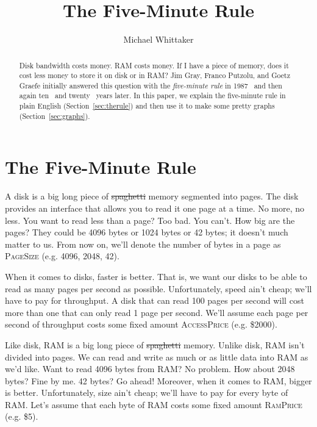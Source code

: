 \documentclass[12pt]{article}
\title{The Five-Minute Rule}
\author{Michael Whittaker}
\date{}
\newcommand{\emf}[1]{\textcolor{berkgoldalt}{#1}}
\newcommand{\secref}[1]{Section~\ref{sec:#1}}
\begin{document}
\maketitle

\begin{abstract}
  Disk bandwidth costs money. RAM costs money. If I have a piece of memory, does
  it cost less money to store it on disk or in RAM? Jim Gray, Franco Putzolu,
  and Goetz Graefe initially answered this question with the \emph{five-minute
  rule} in 1987~\cite{gray19875} and then again ten~\cite{gray1998five} and
  twenty~\cite{graefe2007five} years later. In this paper, we explain the
  five-minute rule in plain English (\secref{therule}) and then use it to make
  some pretty graphs (\secref{graphs}).
\end{abstract}

\section{The Five-Minute Rule}\label{sec:therule}
\newcommand{\pagesize}{\textsc{PageSize}}
\newcommand{\ramprice}{\textsc{RamPrice}}
\newcommand{\accessprice}{\textsc{AccessPrice}}
\newcommand{\memsize}{\textsc{MemSize}}
\newcommand{\accessperiod}{\textsc{AccessPeriod}}

A disk is a big long piece of \st{spaghetti} memory segmented into pages. The
disk provides an interface that allows you to read it one page at a time. No
more, no less. You want to read less than a page? Too bad. You can't. How big
are the pages? They could be 4096 bytes or 1024 bytes or 42 bytes; it doesn't
much matter to us. From now on, we'll denote the number of bytes in a page as
\emf{\pagesize{}} (e.g. 4096, 2048, 42).

When it comes to disks, faster is better. That is, we want our disks to be able
to read as many pages per second as possible. Unfortunately, speed ain't cheap;
we'll have to pay for throughput. A disk that can read 100 pages per second
will cost more than one that can only read 1 page per second. We'll assume each
page per second of throughput costs some fixed amount \emf{\accessprice} (e.g.
\$2000).

Like disk, RAM is a big long piece of \st{spaghetti} memory. Unlike disk, RAM
isn't divided into pages. We can read and write as much or as little data into
RAM as we'd like. Want to read 4096 bytes from RAM? No problem. How about 2048
bytes? Fine by me. 42 bytes? Go ahead! Moreover, when it comes to RAM, bigger
is better. Unfortunately, size ain't cheap; we'll have to pay for every byte of
RAM. Let's assume that each byte of RAM costs some fixed amount
\emf{\ramprice{}} (e.g. \$5).
\end{document}
